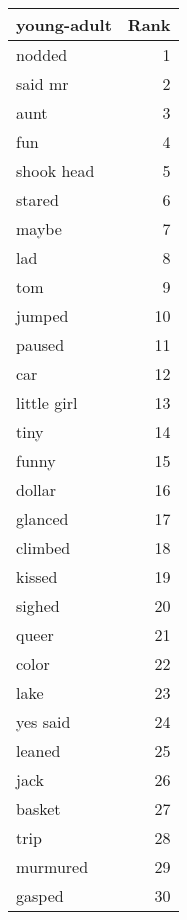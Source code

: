 \begin{table}
\label{tab:young-adult_terms}
\begin{tabular}{lr}
\toprule
young-adult & Rank \\
\midrule
nodded & 1 \\
said mr & 2 \\
aunt & 3 \\
fun & 4 \\
shook head & 5 \\
stared & 6 \\
maybe & 7 \\
lad & 8 \\
tom & 9 \\
jumped & 10 \\
paused & 11 \\
car & 12 \\
little girl & 13 \\
tiny & 14 \\
funny & 15 \\
dollar & 16 \\
glanced & 17 \\
climbed & 18 \\
kissed & 19 \\
sighed & 20 \\
queer & 21 \\
color & 22 \\
lake & 23 \\
yes said & 24 \\
leaned & 25 \\
jack & 26 \\
basket & 27 \\
trip & 28 \\
murmured & 29 \\
gasped & 30 \\
\bottomrule
\end{tabular}
\end{table}
